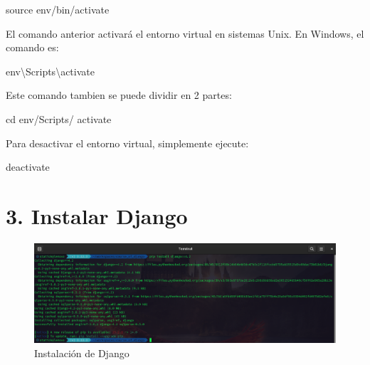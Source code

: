 \documentclass[
  a4paper,
  DIV=11,
  numbers=noendperiod,
  onepage,
  openany]{scrreprt}
\newenvironment{Shaded}{\begin{snugshade}}{\end{snugshade}}
\newcommand{\BuiltInTok}[1]{\textcolor[rgb]{0.00,0.23,0.31}{#1}}
\newcommand{\DataTypeTok}[1]{\textcolor[rgb]{0.68,0.00,0.00}{#1}}
\newcommand{\ExtensionTok}[1]{\textcolor[rgb]{0.00,0.23,0.31}{#1}}
\newcommand{\FunctionTok}[1]{\textcolor[rgb]{0.28,0.35,0.67}{#1}}
\newcommand{\NormalTok}[1]{\textcolor[rgb]{0.00,0.23,0.31}{#1}}
\begin{document}
\begin{Shaded}
\begin{Highlighting}[]
\BuiltInTok{source}\NormalTok{ env/bin/activate}
\end{Highlighting}
\end{Shaded}

El comando anterior activará el entorno virtual en sistemas Unix. En
Windows, el comando es:

\begin{Shaded}
\begin{Highlighting}[]
\FunctionTok{env}\DataTypeTok{\textbackslash{}S}\NormalTok{cripts}\DataTypeTok{\textbackslash{}a}\NormalTok{ctivate}
\end{Highlighting}
\end{Shaded}

Este comando tambien se puede dividir en 2 partes:

\begin{Shaded}
\begin{Highlighting}[]
\BuiltInTok{cd}\NormalTok{ env/Scripts/}
\ExtensionTok{activate}
\end{Highlighting}
\end{Shaded}

Para desactivar el entorno virtual, simplemente ejecute:

\begin{Shaded}
\begin{Highlighting}[]
\ExtensionTok{deactivate}
\end{Highlighting}
\end{Shaded}

\section{3. Instalar Django}\label{instalar-django}

\begin{figure}[H]

{\centering \includegraphics{images/instalacion_django.png}

}

\caption{Instalación de Django}

\end{figure}%
\end{document}
